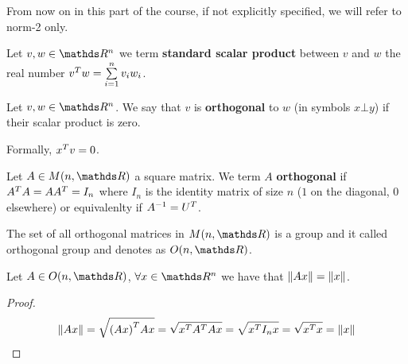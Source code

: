 \documentclass[computationalMathematics.tex]{subfiles}
\begin{document}
From now on in this part of the course, if not explicitly specified, we will refer to norm-2 only.

\begin{definition}
  Let $v, w \in \R^n$ we term \textbf{standard scalar product} between $v$ and $w$ the real number ${v}^{T} w = \sum\limits_{i=1}^n v_i w_i$.
\end{definition}

\begin{definition}
  Let $v, w \in \R^n$. We say that $v$ is \textbf{orthogonal} to $w$ (in symbols $x \bot y$) if their scalar product is zero.
  
  Formally, ${x}^{T} v = 0$.
\end{definition}

\begin{definition}
  Let $A \in M(n, \R)$ a square matrix.
  We term $A$ \textbf{orthogonal} if ${A}^{T} A = A {A}^{T} = I_{n}$ where $I_n$ is the identity matrix of size $n$ ($1$ on the diagonal, $0$ elsewhere) or equivalenlty if ${A}^{-1} = {U}^{T}$.

  The set of all orthogonal matrices in $M(n, \R)$ is a group and it called orthogonal group and denotes as $O(n, \R)$.
\end{definition}

\begin{proposition}\label{fact:20sett}
  Let $A \in O(n, \R)$, $\forall x \in \R^n$ we have that $\left\lVert Ax\right\rVert = \left\lVert x\right\rVert$. 
\end{proposition}

\begin{proof}
  \[
    \left\lVert Ax\right\rVert = \sqrt{{(Ax)}^{T} Ax} = \sqrt{{x}^{T}{A}^{T} A x} = \sqrt{{x}^{T} I_n x} = \sqrt{{x}^{T} x} = \left\lVert x\right\rVert
  \]
\end{proof}
\end{document}
